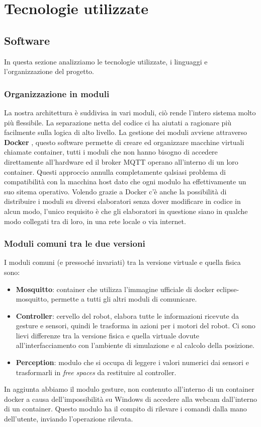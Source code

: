 \documentclass[]{article}
\begin{document}
\pagebreak
\section{Tecnologie utilizzate}
\subsection{Software}
In questa sezione analizziamo le tecnologie utilizzate, i linguaggi e l'organizzazione del progetto.

\subsubsection{Organizzazione in moduli}
La nostra architettura è suddivisa in vari moduli, ciò rende l'intero sistema molto più flessibile.
La separazione netta del codice ci ha aiutati a ragionare più facilmente sulla logica di alto livello.
La gestione dei moduli avviene attraverso \textbf{Docker} \cite{docker}, questo software permette di creare ed organizzare
macchine virtuali chiamate container, tutti i moduli che non hanno bisogno di accedere direttamente all'hardware ed il broker MQTT operano all'interno di un loro container.
Questi approccio annulla completamente qalsiasi problema di compatibilità con la macchina host dato che ogni modulo ha effettivamente un suo sitema operativo.
Volendo grazie a Docker c'è anche la possibilità di distribuire i moduli su diversi elaboratori senza dover modificare in codice in alcun modo,
l'unico requisito è che gli elaboratori in questione siano in qualche modo collegati tra di loro, in una rete locale o via internet.


\subsubsection*{Moduli comuni tra le due versioni}
I moduli comuni (e pressoché invariati) tra la versione virtuale e quella fisica sono:
\begin{itemize}
    \item \textbf{Mosquitto}: container che utilizza l'immagine ufficiale di docker eclipse-mosquitto, permette a tutti gli altri moduli di comunicare.
    \item \textbf{Controller}: cervello del robot, elabora tutte le informazioni ricevute da gesture e sensori, quindi le trasforma in azioni per i motori del robot. Ci sono lievi differenze tra la versione fisica e quella virtuale dovute all'interfacciamento con l'ambiente di simulazione e al calcolo della posizione.
    \item \textbf{Perception}: modulo che si occupa di leggere i valori numerici dai sensori e trasformarli in \textit{free spaces} da restituire al controller.
\end{itemize}
In aggiunta abbiamo il modulo gesture, non contenuto all'interno di un container docker a causa dell'impossibilità su Windows di accedere alla webcam dall'interno di un container. Questo modulo ha il compito di rilevare i comandi dalla mano dell'utente, inviando l'operazione rilevata.
\end{document}
